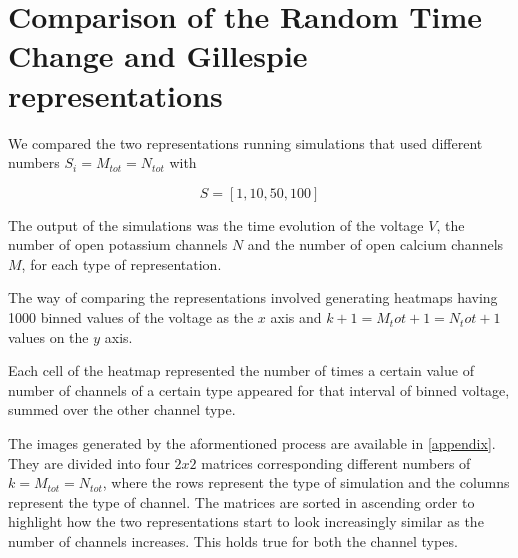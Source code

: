 \section{Comparison of the Random Time Change and Gillespie representations}

We compared the two representations running simulations that used different numbers $S_{i} = M_{tot} = N_{tot}$ with

$$S = [1, 10, 50, 100]$$

The output of the simulations was the time evolution of the voltage $V$, the number of open potassium channels $N$ and the number of open calcium channels $M$, for each type of representation.

The way of comparing the representations involved generating heatmaps having 1000 binned values of the voltage as the $x$ axis and $k + 1 = M_tot + 1 = N_tot  + 1$ values on the $y$ axis. 

Each cell of the heatmap represented the number of times a certain value of number of channels of a certain type appeared for that interval of binned voltage, summed over the other channel type. 

The images generated by the aformentioned process are available in \ref{appendix}. They are divided into four $2x2$ matrices corresponding different numbers of $k = M_{tot} = N_{tot}$, where the rows represent the type of simulation and the columns represent the type of channel. The matrices are sorted in ascending order to highlight how the two representations start to look increasingly similar as the number of channels increases. This holds true for both the channel types.